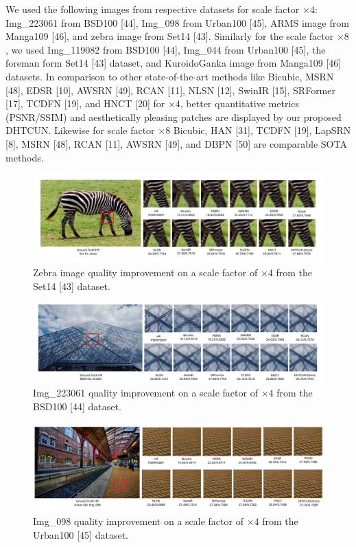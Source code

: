 \documentclass{ieeeaccess}
\begin{document}
We used the following images from respective datasets for scale factor $\times4$: Img\_223061 from BSD100 [44], Img\_098 from Urban100 [45], ARMS image from Manga109 [46], and zebra image from Set14 [43]. Similarly for the scale factor $\times8$, we used Img\_119082 from BSD100 [44], Img\_044 from Urban100 [45], the foreman form Set14 [43] dataset, and KuroidoGanka image from Manga109 [46] datasets. In comparison to other state-of-the-art methods like Bicubic, MSRN [48], EDSR [10], AWSRN [49], RCAN [11], NLSN [12], SwinIR [15], SRFormer [17], TCDFN [19], and HNCT [20] for $\times4$, better quantitative metrics (PSNR/SSIM) and aesthetically pleasing patches are displayed by our proposed DHTCUN. Likewise for scale factor $\times8$ Bicubic, HAN [31], TCDFN [19], LapSRN [8], MSRN [48], RCAN [11], AWSRN [49], and DBPN [50] are comparable SOTA methods. 

\begin{figure}
    \centering

    \includegraphics[width=\linewidth]{12Figure.pdf}
    \caption{Zebra image quality improvement on a scale factor of $\times4$ from the Set14 [43] dataset.}
    \label{fig:12}
\end{figure}

\begin{figure}
    \centering

    \includegraphics[width=\linewidth]{13Figure.pdf}
    \caption{Img\_223061 quality improvement on a scale factor of $\times4$ from the BSD100 [44] dataset.}
    \label{fig:13}
\end{figure}

\begin{figure}
    \centering

    \includegraphics[width=\linewidth]{14Figure.pdf}
    \caption{Img\_098 quality improvement on a scale factor of $\times4$ from the Urban100 [45] dataset.}
    \label{fig:14}
\end{figure}
\end{document}
